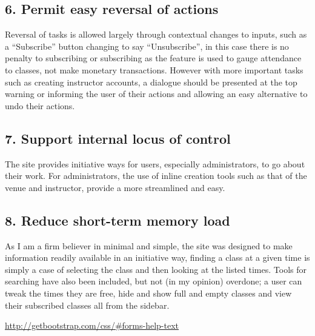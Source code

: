\documentclass[10pt]{article}
\begin{document}
      \subsection{6. Permit easy reversal of actions}
        Reversal of tasks is allowed largely through contextual changes to inputs, such as a ``Subscribe'' button changing to say ``Unsubscribe'', in this case there is no penalty to subscribing or subscribing as the feature is used to gauge attendance to classes, not make monetary transactions. However with more important tasks such as creating instructor accounts, a dialogue should be presented at the top warning or informing the user of their actions and allowing an easy alternative to undo their actions. 

      \subsection{7. Support internal locus of control}
        The site provides initiative ways for users, especially administrators, to go about their work. For administrators, the use of inline creation tools such as that of the venue and instructor, provide a more streamlined and easy.

      \subsection{8. Reduce short-term memory load}
        As I am a firm believer in minimal and simple, the site was designed to make information readily available in an initiative way, finding a class at a given time is simply a case of selecting the class and then looking at the listed times. Tools for searching have also been included, but not (in my opinion) overdone; a user can tweak the times they are free, hide and show full and empty classes and view their subscribed classes all from the sidebar. 

    \begin{thebibliography}{9}
        \url{http://getbootstrap.com/css/#forms-help-text}
    \end{thebibliography}
\end{document}
